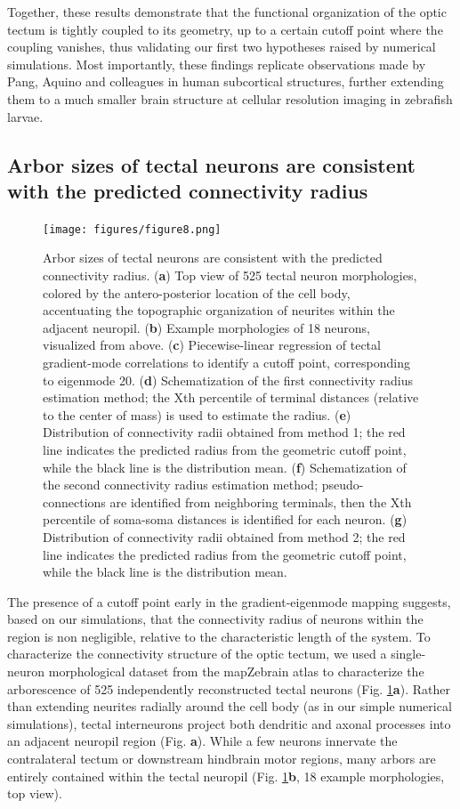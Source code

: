 \documentclass{article}
\begin{document}
Together, these results demonstrate that the functional organization of the optic tectum is tightly coupled to its geometry, up to a certain cutoff point where the coupling vanishes, thus validating our first two hypotheses raised by numerical simulations. Most importantly, these findings replicate observations made by Pang, Aquino and colleagues in human subcortical structures, further extending them to a much smaller brain structure at cellular resolution imaging in zebrafish larvae.

\subsection*{Arbor sizes of tectal neurons are consistent with the predicted connectivity radius}

\begin{figure}[t]
    \centering
    \texttt{[image: figures/figure8.png]}
    \caption{Arbor sizes of tectal neurons are consistent with the predicted connectivity radius. (\textbf{a}) Top view of 525 tectal neuron morphologies, colored by the antero-posterior location of the cell body, accentuating the topographic organization of neurites within the adjacent neuropil. (\textbf{b}) Example morphologies of 18 neurons, visualized from above. (\textbf{c}) Piecewise-linear regression of tectal gradient-mode correlations to identify a cutoff point, corresponding to eigenmode 20. (\textbf{d}) Schematization of the first connectivity radius estimation method; the Xth percentile of terminal distances (relative to the center of mass) is used to estimate the radius. (\textbf{e}) Distribution of connectivity radii obtained from method 1; the red line indicates the predicted radius from the geometric cutoff point, while the black line is the distribution mean. (\textbf{f}) Schematization of the second connectivity radius estimation method; pseudo-connections are identified from neighboring terminals, then the Xth percentile of soma-soma distances is identified for each neuron. (\textbf{g}) Distribution of connectivity radii obtained from method 2; the red line indicates the predicted radius from the geometric cutoff point, while the black line is the distribution mean.}
    \label{fig7}
    \hrulefill
\end{figure}

The presence of a cutoff point early in the gradient-eigenmode mapping suggests, based on our simulations, that the connectivity radius of neurons within the region is non negligible, relative to the characteristic length of the system. To characterize the connectivity structure of the optic tectum, we used a single-neuron morphological dataset from the mapZebrain atlas to characterize the arborescence of 525 independently reconstructed tectal neurons (Fig. \ref{fig7}\textbf{a}). Rather than extending neurites radially around the cell body (as in our simple numerical simulations), tectal interneurons project both dendritic and axonal processes into an adjacent neuropil region (Fig. \textbf{a}). While a few neurons innervate the contralateral tectum or downstream hindbrain motor regions, many arbors are entirely contained within the tectal neuropil (Fig. \ref{fig7}\textbf{b}, 18 example morphologies, top view). 
\end{document}
